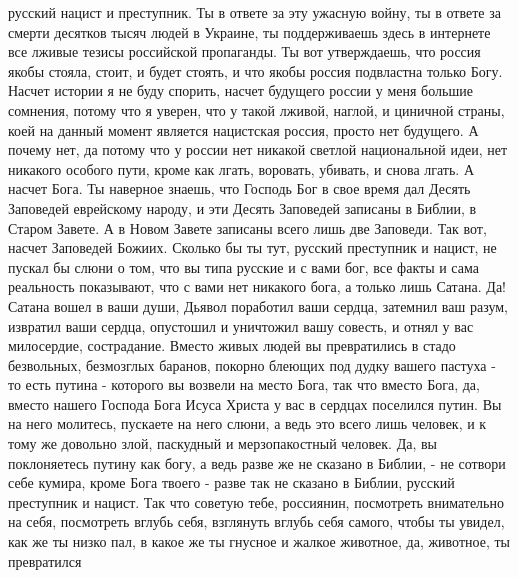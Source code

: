  
 
 
 
 


русский нацист и преступник. Ты в ответе за эту ужасную войну, ты в ответе за
смерти десятков тысяч людей в Украине, ты поддерживаешь здесь в интернете все
лживые тезисы российской пропаганды. Ты вот утверждаешь, что россия якобы
стояла, стоит, и будет стоять, и что якобы россия подвластна только Богу.
Насчет истории я не буду спорить, насчет будущего россии у меня большие
сомнения, потому что я уверен, что у такой лживой, наглой, и циничной страны,
коей на данный момент является нацистская россия, просто нет будущего.  А
почему нет, да потому что у россии нет никакой светлой национальной идеи, нет
никакого особого пути, кроме как лгать, воровать, убивать, и снова лгать. А
насчет Бога. Ты наверное знаешь, что Господь Бог в свое время дал Десять
Заповедей еврейскому народу, и эти Десять Заповедей записаны в Библии, в Старом
Завете. А в Новом Завете записаны всего лишь две Заповеди. Так вот, насчет
Заповедей Божиих. Сколько бы ты тут, русский преступник и нацист, не пускал бы
слюни о том, что вы типа русские и с вами бог, все факты и сама реальность
показывают, что с вами нет никакого бога, а только лишь Сатана. Да! Сатана
вошел в ваши души, Дьявол поработил ваши сердца, затемнил ваш разум, извратил
ваши сердца, опустошил и уничтожил вашу совесть, и отнял у вас милосердие,
сострадание. Вместо живых людей вы превратились в стадо безвольных, безмозглых
баранов, покорно блеющих под дудку вашего пастуха - то есть путина - которого
вы возвели на место Бога, так что вместо Бога, да, вместо нашего Господа Бога
Исуса Христа у вас в сердцах поселился путин. Вы на него молитесь, пускаете на
него слюни, а ведь это всего лишь человек, и к тому же довольно злой, паскудный
и мерзопакостный человек. Да, вы поклоняетесь путину как богу, а ведь разве же
не сказано в Библии, - не сотвори себе кумира, кроме Бога твоего - разве так не
сказано в Библии, русский преступник и нацист. Так что советую тебе, россиянин,
посмотреть внимательно на себя, посмотреть вглубь себя, взглянуть вглубь себя
самого, чтобы ты увидел, как же ты низко пал, в какое же ты гнусное и жалкое
животное, да, животное, ты превратился
